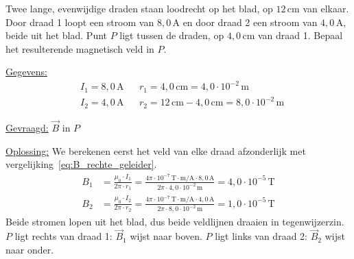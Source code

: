 \documentclass{ximera}
\begin{document}
\begin{example}[foldable=true,title={Twee evenwijdige draden}]\nl
    Twee lange, evenwijdige draden staan loodrecht op het blad, op $12\,\mathrm{cm}$ van elkaar. Door draad 1 loopt een stroom van $8{,}0\,\mathrm{A}$ en door draad 2 een stroom van $4{,}0\,\mathrm{A}$, beide uit het blad. Punt $P$ ligt tussen de draden, op $4{,}0\,\mathrm{cm}$ van draad 1. Bepaal het resulterende magnetisch veld in $P$.

    \begin{center}
    \end{center}

    \begin{solution}\nl
        \underline{Gegevens:}
        \begin{align*}
            & I_1 = 8{,}0\,\mathrm{A} & & r_1 = 4{,}0\,\mathrm{cm} = 4{,}0 \cdot 10^{-2}\,\mathrm{m} \\
            & I_2 = 4{,}0\,\mathrm{A} & & r_2 = 12\,\mathrm{cm} - 4{,}0\,\mathrm{cm} = 8{,}0 \cdot 10^{-2}\,\mathrm{m}
        \end{align*}

        \underline{Gevraagd:} $\vec{B}$ in $P$

        \underline{Oplossing:} We berekenen eerst het veld van elke draad afzonderlijk met vergelijking~\eqref{eq:B_rechte_geleider}.
        \begin{align*}
            B_1 &= \frac{\mu_0 \cdot I_1}{2\pi \cdot r_1} = \frac{4\pi \cdot 10^{-7}\,\mathrm{T\cdot m/A} \cdot 8{,}0\,\mathrm{A}}{2\pi \cdot 4{,}0 \cdot 10^{-2}\,\mathrm{m}} = 4{,}0 \cdot 10^{-5}\,\mathrm{T} \\
            B_2 &= \frac{\mu_0 \cdot I_2}{2\pi \cdot r_2} = \frac{4\pi \cdot 10^{-7}\,\mathrm{T\cdot m/A} \cdot 4{,}0\,\mathrm{A}}{2\pi \cdot 8{,}0 \cdot 10^{-2}\,\mathrm{m}} = 1{,}0 \cdot 10^{-5}\,\mathrm{T}
        \end{align*}
        Beide stromen lopen uit het blad, dus beide veldlijnen draaien in tegenwijzerzin. $P$ ligt rechts van draad 1: $\vec{B}_1$ wijst naar boven. $P$ ligt links van draad 2: $\vec{B}_2$ wijst naar onder.


\end{solution}
\end{example}
\end{document}

